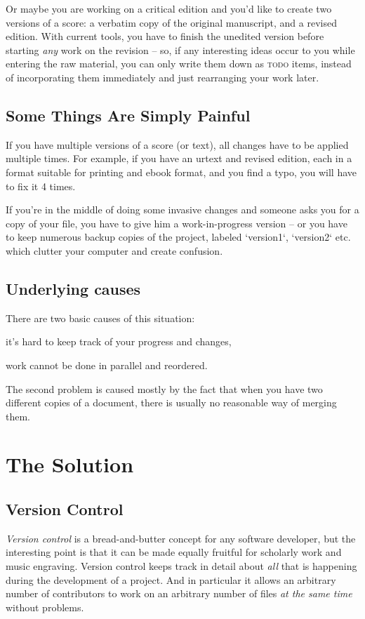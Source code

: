 \documentclass[11pt,a4paper]{article}
\begin{document}
Or maybe you are working on a critical edition and you'd like to create two versions
of a score: a verbatim copy of the original manuscript, and a revised edition.
With current tools, you have to finish the unedited version before starting
\emph{any} work on the revision -- so, if any interesting ideas occur to you
while entering the raw material, you can only write them down as \textsc{todo}
items, instead of incorporating them immediately and just rearranging your work later.

\subsection{Some Things Are Simply Painful}
If you have multiple versions of a score (or text), all changes have to be applied
multiple times.  For example, if you have an urtext and revised edition, each in
a format suitable for printing and ebook format, and you find a typo, you will
have to fix it 4 times.

If you're in the middle of doing some invasive changes and someone asks you for
a copy of your file, you have to give him a work-in-progress version -- or you
have to keep numerous backup copies of the project, labeled `version1`, `version2`
etc. which clutter your computer and create confusion.

\subsection{Underlying causes}
There are two basic causes of this situation:
\begin{itemize*}
\item it's hard to keep track of your progress and changes,
\item work cannot be done in parallel and reordered.
\end{itemize*}

The second problem is caused mostly by the fact that when you have two different
copies of a document, there is usually no reasonable way of merging them.

\section{The Solution}

\subsection{Version Control}
\emph{Version control} is a bread-and-butter concept for any software developer, but the
interesting point is that it can be made equally fruitful for scholarly work and music
engraving. Version control keeps track in detail about \emph{all} that is happening during
the development of a project. And in particular it allows an arbitrary number of contributors
to work on an arbitrary number of files \emph{at the same time} without problems.
\end{document}
